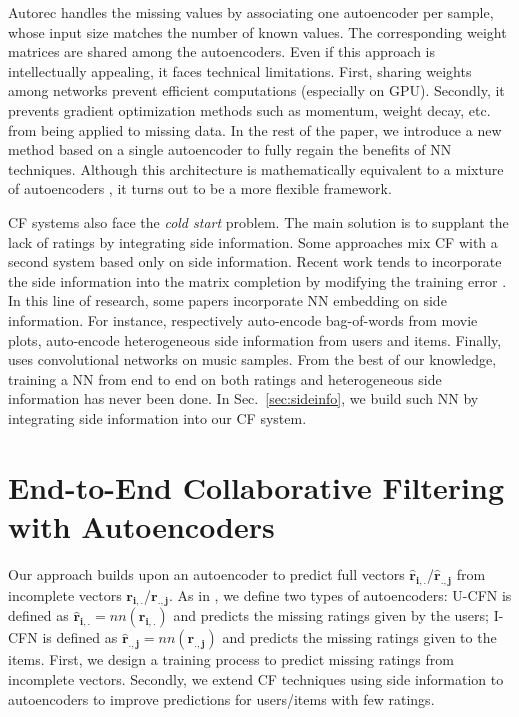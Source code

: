\documentclass{article}
\newcommand{\mtx}[1]{\ensuremath{\mathbf{#1}}}
\newcommand{\usparse}{\mtx{r_{i,.}}}
\newcommand{\vsparse}{\mtx{r_{.,j}}}
\newcommand{\uestim}{\mtx{\hat{r}_{i,.}}}
\newcommand{\vestim}{\mtx{\hat{r}_{.,j}}}
\begin{document}
Autorec \cite{Sedhain2015} handles the missing values by associating one autoencoder per sample, whose input size matches the number of known values. The corresponding weight matrices are shared among the autoencoders. Even if this approach is intellectually appealing, it faces technical limitations. First, sharing weights among networks prevent efficient computations (especially on GPU). Secondly, it prevents gradient optimization methods such as momentum, weight decay, etc. from being applied to missing data.
In the rest of the paper, we introduce a new method based on a single autoencoder to fully regain the benefits of NN techniques. Although this architecture is mathematically equivalent to a mixture of autoencoders \cite{Sedhain2015}, it turns out to be a more flexible framework.


CF systems also face the \emph{cold start} problem. The main solution is to supplant the lack of ratings by integrating side information. Some approaches \cite{Burke:2002} mix CF with a second system based only on side information. Recent work tends to incorporate the side information into the matrix completion by modifying the training error \cite{Adams2010,Chen2012,Rendle2010,Porteous2010}. 
In this line of research, some papers incorporate NN embedding on side information. For instance, \cite{Wang2014} respectively auto-encode bag-of-words from movie plots, \cite{Li2015} auto-encode heterogeneous side information from users and items. Finally, \cite{Wang2014b} uses convolutional networks on music samples. From the best of our knowledge, training a NN from end to end on both ratings and heterogeneous side information has never been done. In Sec.~\ref{sec:sideinfo}, we build such NN by integrating side information into our CF system.





\section{End-to-End Collaborative Filtering with Autoencoders }
\label{sec:model}

 
Our approach builds upon an autoencoder to predict full vectors $\uestim$/$\vestim$ from incomplete vectors $\usparse$/$\vsparse$. As in \cite{Salakhutdinov2008,Sedhain2015,Strub2015}, we define two types of autoencoders: U-CFN is defined as $\uestim = nn(\usparse)$ and predicts the missing ratings given by the users; I-CFN is defined as $\vestim = nn(\vsparse)$ and predicts the missing ratings given to the items. First, we design a training process to predict missing ratings from incomplete vectors. Secondly, we extend CF techniques using side information to autoencoders to improve predictions for users/items with few ratings.
\end{document}
